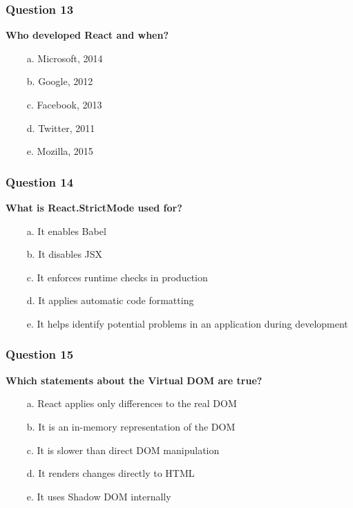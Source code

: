 \documentclass{article}
\newcommand{\cmark}{\textcolor{green}{\ding{51}}} %
\newcommand{\xmark}{\textcolor{red}{\ding{55}}}   %
\begin{document}
\subsubsection*{Question 13}
\textbf{Who developed React and when?}

\begin{itemize}
  \item[\xmark\ a.] Microsoft, 2014
  \item[\xmark\ b.] Google, 2012
  \item[\cmark\ c.] Facebook, 2013
  \item[\xmark\ d.] Twitter, 2011
  \item[\xmark\ e.] Mozilla, 2015
\end{itemize}

\subsubsection*{Question 14}
\textbf{What is React.StrictMode used for?}

\begin{itemize}
  \item[\xmark\ a.] It enables Babel
  \item[\xmark\ b.] It disables JSX
  \item[\xmark\ c.] It enforces runtime checks in production
  \item[\xmark\ d.] It applies automatic code formatting
  \item[\cmark\ e.] It helps identify potential problems in an application during development
\end{itemize}

\subsubsection*{Question 15}
\textbf{Which statements about the Virtual DOM are true?}

\begin{itemize}
  \item[\cmark\ a.] React applies only differences to the real DOM
  \item[\cmark\ b.] It is an in-memory representation of the DOM
  \item[\xmark\ c.] It is slower than direct DOM manipulation
  \item[\xmark\ d.] It renders changes directly to HTML
  \item[\xmark\ e.] It uses Shadow DOM internally
\end{itemize}
\end{document}
